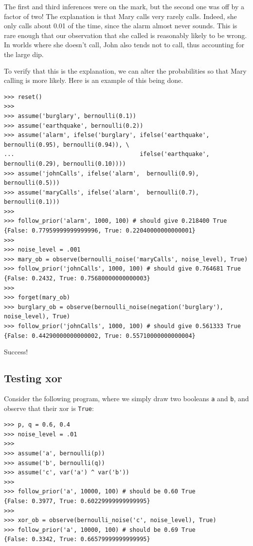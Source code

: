 \documentclass[11pt]{article}
\begin{document}
The first and third inferences were on the mark, but the second one was off by a factor of two!   The explanation is that Mary calls very rarely calls.  Indeed, she only calls about 0.01 of the time, since the alarm almost never sounds.  This is rare enough that our observation that she called is reasonably likely to be wrong.  In worlds where she doesn't call, John also tends not to call, thus accounting for the large dip. \vspace{6 pt}

To verify that this is the explanation, we can alter the probabilities so that Mary calling is more likely.  Here is an example of this being done.

\begin{small}
\begin{verbatim}
>>> reset()
>>>
>>> assume('burglary', bernoulli(0.1))
>>> assume('earthquake', bernoulli(0.2))
>>> assume('alarm', ifelse('burglary', ifelse('earthquake', bernoulli(0.95), bernoulli(0.94)), \
...                                    ifelse('earthquake', bernoulli(0.29), bernoulli(0.10))))
>>> assume('johnCalls', ifelse('alarm',  bernoulli(0.9), bernoulli(0.5)))
>>> assume('maryCalls', ifelse('alarm',  bernoulli(0.7), bernoulli(0.1)))
>>>
>>> follow_prior('alarm', 1000, 100) # should give 0.218400 True
{False: 0.77959999999999996, True: 0.22040000000000001}
>>>
>>> noise_level = .001
>>> mary_ob = observe(bernoulli_noise('maryCalls', noise_level), True)
>>> follow_prior('johnCalls', 1000, 100) # should give 0.764681 True
{False: 0.2432, True: 0.75680000000000003}
>>>
>>> forget(mary_ob)
>>> burglary_ob = observe(bernoulli_noise(negation('burglary'), noise_level), True)
>>> follow_prior('johnCalls', 1000, 100) # should give 0.561333 True
{False: 0.44290000000000002, True: 0.55710000000000004}
\end{verbatim}
\end{small}

\noindent Success!


\subsection{Testing xor}

\noindent Consider the following program, where we simply draw two booleans {\tt a} and {\tt b}, and observe that their xor is {\tt True}:

\begin{small}
\begin{verbatim}
>>> p, q = 0.6, 0.4
>>> noise_level = .01
>>>
>>> assume('a', bernoulli(p))
>>> assume('b', bernoulli(q))
>>> assume('c', var('a') ^ var('b'))
>>>
>>> follow_prior('a', 10000, 100) # should be 0.60 True
{False: 0.3977, True: 0.60229999999999995}
>>>
>>> xor_ob = observe(bernoulli_noise('c', noise_level), True)
>>> follow_prior('a', 10000, 100) # should be 0.69 True
{False: 0.3342, True: 0.66579999999999995}
\end{verbatim}
\end{small}
\end{document}
